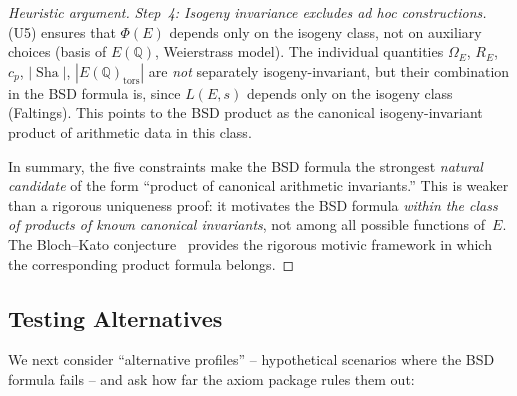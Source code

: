 \documentclass[aps,prd,twocolumn,superscriptaddress,nofootinbib,floatfix]{revtex4-2}
\theoremstyle{definition}
\theoremstyle{remark}
\DeclareMathOperator{\Sha}{Sha}
\begin{document}
\begin{proof}[Heuristic argument]
\textit{Step~4: Isogeny invariance excludes ad hoc constructions.} (U5) ensures that $\Phi(E)$ depends only on the isogeny class, not on auxiliary choices (basis of $E(\mathbb{Q})$, Weierstrass model). The individual quantities $\Omega_E$, $R_E$, $c_p$, $|\Sha|$, $|E(\mathbb{Q})_{\mathrm{tors}}|$ are \textit{not} separately isogeny-invariant, but their combination in the BSD formula is, since $L(E,s)$ depends only on the isogeny class (Faltings). This points to the BSD product as the canonical isogeny-invariant product of arithmetic data in this class.

In summary, the five constraints make the BSD formula the strongest \textit{natural candidate} of the form ``product of canonical arithmetic invariants.'' This is weaker than a rigorous uniqueness proof: it motivates the BSD formula \textit{within the class of products of known canonical invariants}, not among all possible functions of~$E$. The Bloch--Kato conjecture~\cite{BlochKato1990} provides the rigorous motivic framework in which the corresponding product formula belongs.
\end{proof}

\subsection{Testing Alternatives}

We next consider ``alternative profiles'' -- hypothetical scenarios where the BSD formula fails -- and ask how far the axiom package rules them out:
\end{document}
